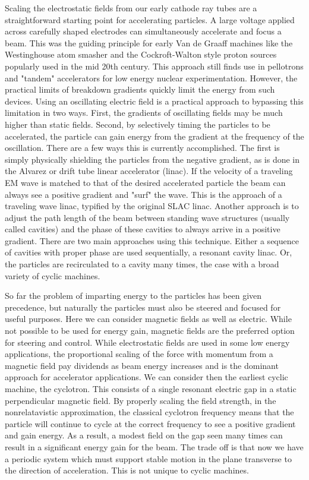 Scaling the electrostatic fields from our early cathode ray tubes are a straightforward starting point for accelerating particles. A large voltage applied across carefully shaped electrodes can simultaneously accelerate and focus a beam. This was the guiding principle for early Van de Graaff machines like the Westinghouse atom smasher and the Cockroft-Walton style proton sources popularly used in the mid 20th century. This approach still finds use in pellotrons and "tandem" accelerators for low energy nuclear experimentation. However, the practical limits of breakdown gradients quickly limit the energy from such devices. Using an oscillating electric field is a practical approach to bypassing this limitation in two ways. First, the gradients of oscillating fields may be much higher than static fields. Second, by selectively timing the particles to be accelerated, the particle can gain energy from the gradient at the frequency of the oscillation. There are a few ways this is currently accomplished. The first is simply physically shielding the particles from the negative gradient, as is done in the Alvarez or drift tube linear accelerator (linac). If the velocity of a traveling EM wave is matched to that of the desired accelerated particle the beam can always see a positive gradient and "surf" the wave. This is the approach of a traveling wave linac, typified by the original SLAC linac. Another approach is to adjust the path length of the beam between standing wave structures (usually called cavities) and the phase of these cavities to always arrive in a positive gradient. There are two main approaches using this technique. Either a sequence of cavities with proper phase are used sequentially, a resonant cavity linac. Or, the particles are recirculated to a cavity many times, the case with a broad variety of cyclic machines.

So far the problem of imparting energy to the particles has been given precedence, but naturally the particles must also be steered and focused for useful purposes. Here we can consider magnetic fields as well as electric. While not possible to be used for energy gain, magnetic fields are the preferred option for steering and control. While electrostatic fields are used in some low energy applications, the proportional scaling of the force with momentum from a magnetic field pay dividends as beam energy increases and is the dominant approach for accelerator applications. We can consider then the earliest cyclic machine, the cyclotron. This consists of a single resonant electric gap in a static perpendicular magnetic field. By properly scaling the field strength, in the nonrelatavistic approximation, the classical cyclotron frequency means that the particle will continue to cycle at the correct frequency to see a positive gradient and gain energy. As a result, a modest field on the gap seen many times can result in a significant energy gain for the beam. The trade off is that now we have a periodic system which must support stable motion in the plane transverse to the direction of acceleration. This is not unique to cyclic machines.

